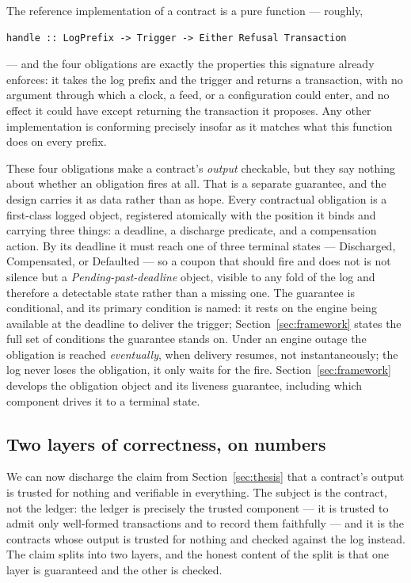 The reference implementation of a contract is a pure function --- roughly,

\begin{lstlisting}
handle :: LogPrefix -> Trigger -> Either Refusal Transaction
\end{lstlisting}

--- and the four obligations are exactly the properties this signature already
enforces: it takes the log prefix and the trigger and returns a transaction, with
no argument through which a clock, a feed, or a configuration could enter, and no
effect it could have except returning the transaction it proposes. Any other
implementation is conforming precisely insofar as it matches what this function
does on every prefix.

These four obligations make a contract's \emph{output} checkable, but they say
nothing about whether an obligation fires at all. That is a separate guarantee, and
the design carries it as data rather than as hope. Every contractual obligation is a
first-class logged object, registered atomically with the position it binds and
carrying three things: a deadline, a discharge predicate, and a compensation action.
By its deadline it must reach one of three terminal states --- Discharged,
Compensated, or Defaulted --- so a coupon that should fire and does not is not
silence but a \emph{Pending-past-deadline} object, visible to any fold of the log
and therefore a detectable state rather than a missing one. The guarantee is
conditional, and its primary condition is named: it rests on the engine being
available at the deadline to deliver the trigger; Section~\ref{sec:framework} states
the full set of conditions the guarantee stands on. Under an engine outage the
obligation is reached \emph{eventually}, when delivery resumes, not instantaneously;
the log never loses the obligation, it only waits for the fire.
Section~\ref{sec:framework} develops the obligation object and its liveness
guarantee, including which component drives it to a terminal state.

\subsection{Two layers of correctness, on numbers}

We can now discharge the claim from Section~\ref{sec:thesis} that a contract's
output is trusted for nothing and verifiable in everything. The subject is the
contract, not the ledger: the ledger is precisely the trusted component --- it is
trusted to admit only well-formed transactions and to record them faithfully --- and
it is the contracts whose output is trusted for nothing and checked against the log
instead. The claim splits into two layers, and the honest content of the split is
that one layer is guaranteed and the other is checked.


